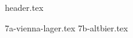 \clearpage
{}
\divisorLine
{header.tex}
\begin{multicols*}{2}
{7a-vienna-lager.tex}
{7b-altbier.tex}
\end{multicols*}